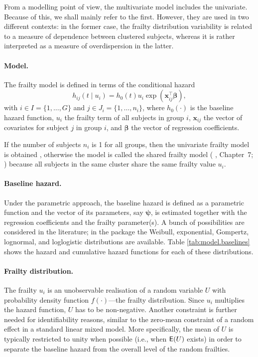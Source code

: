From a modelling point of view, the multivariate model includes the univariate.
Because of this, we shall mainly refer to the first.
However, they are used in two different contexts: 
	in the former case, the frailty distribution variability is related to a measure of dependence between clustered subjects,
	whereas it is rather interpreted as a measure of overdispersion in the latter.

\paragraph{Model.}
The frailty model is defined in terms of the conditional hazard 
\begin{equation*}
  h_{ij}(t \mid u_i) = h_0(t) u_i \exp{(\bm{x}_{ij}^\top \bm\beta)},
\end{equation*}
with  $i \in I = \{ 1, \ldots, G \}$ and $j \in J_{i} = \{ 1, \ldots, n_i \}$, where
      $h_0( \cdot )$ is the baseline hazard function,
      $u_i$ the frailty term of all subjects in group $i$,
      $\bm{x}_{ij}$ the vector of covariates for subject $j$ in group $i$, and
      $\bm\beta$ the vector of regression coefficients.

If the number of subjects $n_i$ is 1 for all groups, then the univariate frailty model is obtained
  \cite[Chapter~3]{Wienke10},
otherwise the model is called the {shared} frailty model (\citeauthor{Hougaard00} \citeyear{Hougaard00}, Chapter~7; \citeauthor{DuchateauJanssen08} \citeyear{DuchateauJanssen08})
  because all subjects in the same cluster share the same frailty value $u_i$.


\paragraph{Baseline hazard.}
Under the parametric approach, the baseline hazard is defined as a parametric
  function and the vector of its parameters, say $\bm{\psi}$,
  is estimated together with the regression coefficients and the frailty parameter(s).
A bunch of possibilities are considered in the literature;
in the  package the
  Weibull,
  exponential,
  Gompertz,
  lognormal, and
  loglogistic
  distributions are available.
Table \ref{tab:model.baselines} shows the hazard and cumulative hazard functions for each of these distributions.

  


\paragraph{Frailty distribution.}
The frailty $u_i$ is an unobservable realisation of a random variable $U$
  with probability density function $f(\cdot)$---the frailty distribution.
Since $u_i$ multiplies the hazard function, $U$ has to be non-negative.
Another constraint is further needed for identifiability reasons,
  similar to the zero-mean constraint of a random effect in a standard linear mixed model.
More specifically, the mean of $U$ is typically restricted to unity when possible (i.e., when $\mathsf{E}(U)$ exists)
in order to separate the baseline hazard from the overall level of the random frailties.


